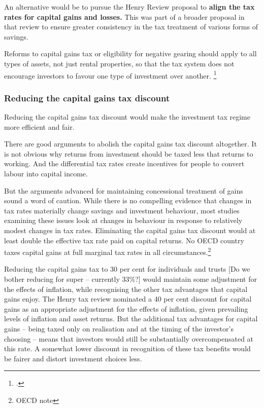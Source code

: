 \documentclass{grattan}\usepackage[]{graphicx}\usepackage[]{color}
\newcommand{\highlight}[1]{\textbf{#1}}
\begin{document}
An alternative would be to pursue the Henry Review proposal to \highlight{align the tax rates for capital gains and losses.} This was part of a broader proposal in that review to ensure greater consistency in the tax treatment of various forms of savings.

Reforms to capital gains tax or eligibility for negative gearing should apply to all types of assets, not just rental properties, so that the tax system does not encourage investors to favour one type of investment over another.  \footcite[p.~133]{Commission2004}

\subsubsection{Reducing the capital gains tax discount}
Reducing the capital gains tax discount would make the investment tax regime more efficient and fair. 

There are good arguments to abolish the capital gains tax discount altogether. It is not obvious why returns from investment should be taxed less that returns to working. And the differential tax rates create incentives for people to convert labour into capital income. 

But the arguments advanced for maintaining concessional treatment of gains sound a word of caution. While there is no compelling evidence that changes in tax rates materially change savings and investment behaviour, most studies examining these issues look at changes in behaviour in response to relatively modest changes in tax rates. Eliminating the capital gains tax discount would at least double the effective tax rate paid on capital returns. No OECD country taxes capital gains at full marginal tax rates in all circumstances.\footnote{OECD note} 

Reducing the capital gains tax to 30 per cent for individuals and trusts [Do we bother reducing for super -- currently 33\%?] would maintain some adjustment for the effects of inflation, while recognising the other tax advantages that capital gains enjoy. The Henry tax review nominated a 40 per cent discount for capital gains as an appropriate adjustment for the effects of inflation, given prevailing levels of inflation and asset returns.  But the additional tax advantages for capital gains -- being taxed only on realisation and at the timing of the investor's choosing -- means that investors would still be substantially overcompensated at this rate. A somewhat lower discount in recognition of these tax benefits would be fairer and distort investment choices less. 
\end{document}
